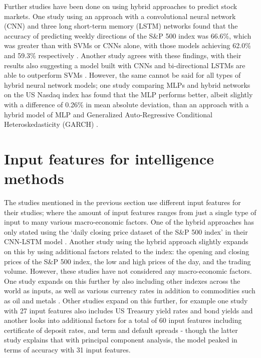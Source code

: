 Further studies have been done on using hybrid approaches to predict stock markets. One study using an approach with a convolutional neural network (CNN) and three long short-term memory (LSTM) networks found that the accuracy of predicting weekly directions of the S\&P 500 index was 66.6\%, which was greater than with SVMs or CNNs alone,  with those models achieving 62.0\% and 59.3\% respectively \parencite{hao_gao_2020}. Another study agrees with these findings, with their results also suggesting a model built with CNNs and bi-directional LSTMs are able to outperform SVMs \parencite{noveldeepcnnbilstm}. However, the same cannot be said for all types of hybrid neural network models; one study comparing MLPs and hybrid networks on the US Nasdaq index has found that the MLP performs better, albeit slightly with a difference of 0.26\% in mean absolute deviation, than an approach with a hybrid model of MLP and Generalized Auto-Regressive Conditional Heteroskedasticity (GARCH) \parencite{GURESEN201110389}.

\section{Input features for intelligence methods}
The studies mentioned in the previous section use different input features for their studies; where the amount of input features ranges from just a single type of input to many various macro-economic factors. One of the hybrid approaches has only stated using the `daily closing price dataset of the S\&P 500 index' in their CNN-LSTM model \parencite{hao_gao_2020}. Another study using the hybrid approach slightly expands on this by using additional factors related to the index: the opening and closing prices of the S\&P 500 index, the low and high prices of the day, and the trading volume. However, these studies have not considered any macro-economic factors. One study expands on this further by also including other indexes across the world as inputs, as well as various currency rates in addition to commodities such as oil and metals \parencite{shen2012stock}. Other studies expand on this further, for example one study with 27 input features also includes US Treasury yield rates and bond yields \parencite{comparisonregannsvm} and another looks into additional factors for a total of 60 input features including certificate of deposit rates, and term and default spreads \parencite{zhong2019predicting} - though the latter study explains that with principal component analysis, the model peaked in terms of accuracy with 31 input features.

